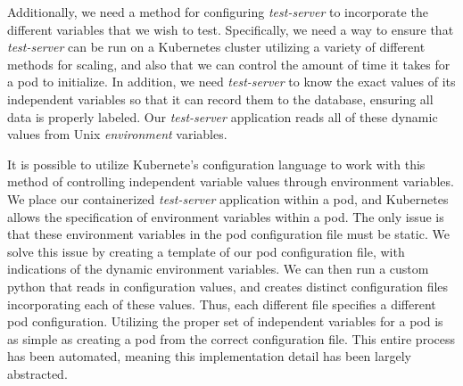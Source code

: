 Additionally, we need a method for configuring
\textit{test-server} to incorporate the different variables that we wish to
test. Specifically, we need a way to ensure that \textit{test-server} can be run
on a Kubernetes cluster utilizing a variety of different methods for scaling,
and also that we can control the amount of time it takes for a pod to
initialize. In addition, we need \textit{test-server} to know the exact values
of its independent variables so that it can record them to the database,
ensuring all data is properly labeled. Our \textit{test-server} application
reads all of these dynamic values from Unix \textit{environment} variables.

It is possible to utilize Kubernete's configuration language to work with this
method of controlling independent variable values through environment variables.
We place our containerized \textit{test-server} application within a pod, and
Kubernetes allows the specification of environment variables within a pod. The
only issue is that these environment variables in the pod configuration file
must be static. We solve this issue by creating a template of our pod
configuration file, with indications of the dynamic environment variables. We
can then run a custom python that reads in configuration values, and creates
distinct configuration files incorporating each of these values. Thus, each
different file specifies a different pod configuration. Utilizing the proper
set of independent variables for a pod is as simple as creating a pod from the
correct configuration file. This entire process has been automated, meaning this
implementation detail has been largely abstracted.
